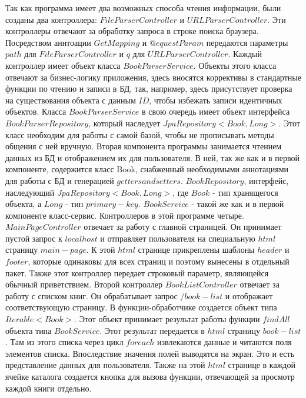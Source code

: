 \newline Так как программа имеет два возможных способа чтения информации, были созданы два контроллера: $FileParserController$ и $URLParserController$. Эти контроллеры отвечают за обработку запроса в строке поиска браузера. Посредством аннтоации $GetMapping$ и $ @equestParam$ передаются параметры $path$ для $FileParserController$ и $q$ для $URLParserController$.
\newline Каждый контроллер имеет объект класса $BookParserService$. Объекты этого класса отвечают за бизнес-логику приложения, здесь вносятся коррективы в стандартные функции по чтению и записи в БД, так, например, здесь присутствует проверка на существования объекта с данным $ID$, чтобы избежать записи идентичных объектов. Класса $BookParserService$ в свою очередь имеет объект интерфейса $BookParserRepository$, который наследует $JpaRepository<Book, Long>$. Этот класс необходим для работы с самой базой, чтобы не прописывать методы общения с ней вручную.
\newline \newline Вторая компонента программы занимается чтением данных из БД и отображением их для пользователя. В ней, так же как и в первой компоненте, содержится класс Book, снабженный необходимыми аннотациями для работы с БД и генерацией $getters and setters$. $BookRepository$, интерфейс, наследующий $JpaRepository<Book, Long>$, где $Book$ - тип хранящегося объекта, а $Long$ - тип $primary-key$. $BookService$ - такой же как и в первой компоненте класс-сервис.
\newline Контроллеров в этой программе четыре. $MainPageController$ отвечает за работу с главной страницей. Он принимает пустой запрос к $localhost$ и отправляет пользователя на специальную $html$ страницу $main-page$. К этой $html$ странице прикреплены шаблоны $header$ и $footer$, которые одинаковы для всех страниц и поэтому вынесены в отдельный пакет. Также этот контроллер передает строковый параметр, являющейся обычный приветствием.
\newline Второй контроллер $BookListController$ отвечает за работу с списком книг. Он обрабатывает запрос $/book-list$ и отображает соответствующую страницу. В функции-обработчике создается объект типа $Iterable<Book>$. Этот объект принимает результат работы функции $findAll$ объекта типа $BookService$. Этот результат передается в $html$ страницу $book-list$. Там из этого списка через цикл $foreach$ извлекаются данные и читаются поля элементов списка. Впоследствие значения полей выводятся на экран. Это и есть представление данных для пользователя. Также на этой $html$ странице в каждой ячейке каталога создается кнопка для вызова функции, отвечающей за просмотр каждой книги отдельно.
